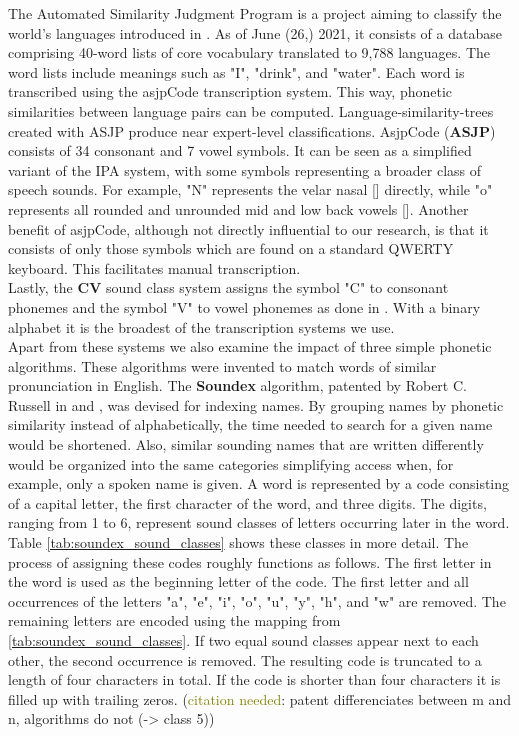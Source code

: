 The Automated Similarity Judgment Program is a project aiming to classify the world's languages introduced in \cite{brown2008asjpCode}.
As of June (26,) 2021, it consists of a database comprising 40-word lists of core vocabulary translated to 9,788 languages.
The word lists include meanings such as "I", "drink", and "water".
Each word is transcribed using the asjpCode transcription system.
This way, phonetic similarities between language pairs can be computed.
Language-similarity-trees created with ASJP produce near expert-level classifications.
AsjpCode (\textbf{ASJP}) consists of 34 consonant and 7 vowel symbols.
It can be seen as a simplified variant of the IPA system, with some symbols representing a broader class of speech sounds.
For example, "N" represents the velar nasal [] directly, while "o" represents all rounded and unrounded mid and low back vowels [].
Another benefit of asjpCode, although not directly influential to our research, is that it consists of only those symbols which are found on a standard QWERTY keyboard.
This facilitates manual transcription.\\
Lastly, the \textbf{CV} sound class system assigns the symbol "C" to consonant phonemes and the symbol "V" to vowel phonemes as done in \cite{list2017lingpy}.
With a binary alphabet it is the broadest of the transcription systems we use.\\

Apart from these systems we also examine the impact of three simple phonetic algorithms.
These algorithms were invented to match words of similar pronunciation in English.
The \textbf{Soundex} algorithm, patented by Robert C. Russell in \cite{russel1918soundex} and \cite{russel1922soundex}, was devised for indexing names.
By grouping names by phonetic similarity instead of alphabetically, the time needed to search for a given name would be shortened.
Also, similar sounding names that are written differently would be organized into the same categories simplifying access when, for example, only a spoken name is given.
A word is represented by a code consisting of a capital letter, the first character of the word, and three digits.
The digits, ranging from 1 to 6, represent sound classes of letters occurring later in the word.
Table \ref{tab:soundex_sound_classes} shows these classes in more detail.
The process of assigning these codes roughly functions as follows.
The first letter in the word is used as the beginning letter of the code.
The first letter and all occurrences of the letters "a", "e", "i", "o", "u", "y", "h", and "w" are removed.
The remaining letters are encoded using the mapping from \ref{tab:soundex_sound_classes}.
If two equal sound classes appear next to each other, the second occurrence is removed.
The resulting code is truncated to a length of four characters in total.
If the code is shorter than four characters it is filled up with trailing zeros.
(\textcolor{olive}{citation needed}: patent differenciates between m and n, algorithms do not (-> class 5))\\

